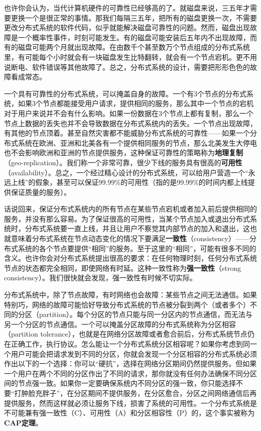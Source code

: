 \documentclass[UTF8,AutoFakeBold=1,AutoFakeSlant,zihao=-4]{cucthesis}
\begin{document}
也许你会认为，当代计算机硬件的可靠性已经够高的了。就磁盘来说，三五年才需要更换一个是很正常的事情。那我们每隔三五年，把所有的磁盘更换一次，不需要更改分布式系统的软件代码，似乎就能解决磁盘可靠性的问题。然而，磁盘出现故障是一个概率性事件，时刻可能发生。有的磁盘可能安装后五年内不出现故障，而有的磁盘可能两个月就出现故障。在由数千个甚至数万个节点组成的分布式系统里，有可能每个小时就会有一块磁盘发生比特翻转，就会有一个节点宕机。更不用说断电、软件错误等其他故障了。总之，分布式系统的设计，需要把形形色色的故障看成常态。

一个具有可靠性的分布式系统，可以掩盖自身的故障。一个有3个节点的分布式系统，如果3个节点都能接受用户请求，提供相同的服务，那么其中一个节点的宕机对于用户来说并不会有什么影响。如果一份数据在3个节点上都有复制，那么一个节点上数据的丢失也并不会导致数据在分布式系统内的丢失。一个节点出现故障，有其他的节点顶着。甚至自然灾害都不能威胁分布式系统的可靠性——如果一个分布式系统在欧洲、亚洲和北美各有一个提供相同服务的节点，那么北美发生大停电也不会影响欧洲和亚洲的节点提供服务，这种保证可靠性的策略称为\textbf{地理复制}（geo-replication）。我们称一个非常可靠，很少下线的服务具有很高的\textbf{可用性}（availability）。总之，一个经过精心设计的分布式系统，可以给用户营造一个“永远上线”的假象，甚至可以保证99.99\%的可用性（指的是99.99\%的时间内都上线提供保证质量的服务）。

话说回来，保证分布式系统内的所有节点在某些节点宕机或者加入前后提供相同的服务，并没有那么容易。为了保证很高的可用性，当某个节点加入或退出分布式系统时，分布式系统要一直上线，并且让用户不察觉其内部节点的加入和退出，这也就意味着分布式系统在节点动态变化的情况下要满足\textbf{一致性}（consistency）——分布式系统的各个节点要提供“相同”的服务。至于这里的“相同”，可能有很多不同的含义。也许你会对分布式系统提出很高的要求：在任何物理时刻，任何分布式系统节点的状态都完全相同，即使网络有时延。这种一致性称为\textbf{强一致性}（strong consistency）。我们很快就会发现，强一致性有时候不切实际。

分布式系统中，除了节点故障，有时网络也会故障：某些节点之间无法通信。如果特别巧，网络的故障可能恰好导致分布式系统的节点被分裂到两个（或者多个）不同的分区（partition）。每个分区的节点只能与同一分区内的节点通信，而无法与另一个分区的节点通信。一个可以掩盖分区故障的分布式系统称为分区相容（partition tolerance），也就是在网络分区故障或者愈合前后，分布式系统节点仍在正确工作，执行协议。怎么能让一个分布式系统分区相容呢？如果你考虑到同一个用户可能会把请求发到不同的分区，你就会发现一个分区相容的分布式系统必须作出以下的一个选择：你可以“硬抗”，选择在网络分区期间仍然提供服务。但如果一个用户在两个不同的分区作出了不同的请求，那你就没有任何办法确保不同分区间的节点强一致。如果你一定要确保系统内不同分区的强一致，你只能选择不要“打肿脸充胖子”，在分区期间不提供服务，在分区愈合，分区之间网络通信后再提供服务，然而这样就必须让服务下线，损害了系统的可用性。一个分布式系统是不可能兼有强一致性（C）、可用性（A）和分区相容性（P）的，这个事实被称为\textbf{CAP定理}。
\end{document}
